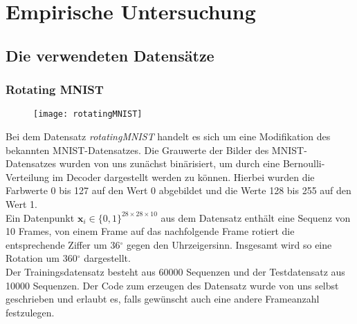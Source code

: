 \documentclass[12pt]{article}
\newcommand{\x}{\mathbf{x}_i}
\begin{document}
	
	





	\newpage
	\section[Empirische Untersuchung]{Empirische Untersuchung}
	\subsection[Datensätze]{Die verwendeten Datensätze}
	\subsubsection{Rotating MNIST}
	\begin{figure}[!htbp]
		\centering
		\texttt{[image: rotatingMNIST]}
	\end{figure}
	Bei dem Datensatz \emph{rotatingMNIST} handelt es sich um eine Modifikation des bekannten MNIST-Datensatzes. Die Grauwerte der Bilder
	des MNIST-Datensatzes wurden von uns zunächst binärisiert, um durch eine Bernoulli-Verteilung im Decoder dargestellt werden zu können.
	Hierbei wurden die Farbwerte 0 bis 127 auf den Wert 0 abgebildet und die Werte 128 bis 255 auf den Wert 1. \\
	Ein Datenpunkt $\x\in \{0,1\}^{28\times 28\times 10}$ aus dem Datensatz enthält eine Sequenz von 10 Frames, von einem Frame auf das nachfolgende Frame rotiert die entsprechende Ziffer um 36$^\circ$ gegen den Uhrzeigersinn. Insgesamt wird so eine Rotation um 360$^\circ$ dargestellt. \\
	Der Trainingsdatensatz besteht aus 60000 Sequenzen und der Testdatensatz aus 10000 Sequenzen. Der Code zum erzeugen des Datensatz wurde von uns selbst geschrieben und erlaubt es, falls gewünscht auch eine andere Frameanzahl festzulegen.
\end{document}
